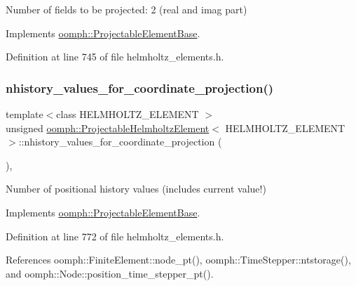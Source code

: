 Number of fields to be projected\+: 2 (real and imag part) 



Implements \hyperlink{classoomph_1_1ProjectableElementBase_a44634aa4049332a580d249c25564638c}{oomph\+::\+Projectable\+Element\+Base}.



Definition at line 745 of file helmholtz\+\_\+elements.\+h.

\mbox{\label{classoomph_1_1ProjectableHelmholtzElement_a4ec9aaa5311ce1724014c4c4240a4d59}} 
\subsubsection{\texorpdfstring{nhistory\+\_\+values\+\_\+for\+\_\+coordinate\+\_\+projection()}{nhistory\_values\_for\_coordinate\_projection()}}
{\footnotesize\ttfamily template$<$class H\+E\+L\+M\+H\+O\+L\+T\+Z\+\_\+\+E\+L\+E\+M\+E\+NT $>$ \\
unsigned \hyperlink{classoomph_1_1ProjectableHelmholtzElement}{oomph\+::\+Projectable\+Helmholtz\+Element}$<$ H\+E\+L\+M\+H\+O\+L\+T\+Z\+\_\+\+E\+L\+E\+M\+E\+NT $>$\+::nhistory\+\_\+values\+\_\+for\+\_\+coordinate\+\_\+projection (\begin{DoxyParamCaption}{ }\end{DoxyParamCaption})\hspace{0.3cm}{\ttfamily [inline]}, {\ttfamily [virtual]}}



Number of positional history values (includes current value!) 



Implements \hyperlink{classoomph_1_1ProjectableElementBase_ab4ecd0cd24000a3ed675dc7198203c1f}{oomph\+::\+Projectable\+Element\+Base}.



Definition at line 772 of file helmholtz\+\_\+elements.\+h.



References oomph\+::\+Finite\+Element\+::node\+\_\+pt(), oomph\+::\+Time\+Stepper\+::ntstorage(), and oomph\+::\+Node\+::position\+\_\+time\+\_\+stepper\+\_\+pt().

